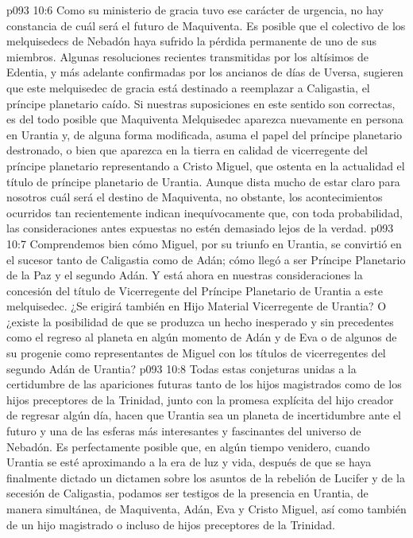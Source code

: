 \vs p093 10:6 Como su ministerio de gracia tuvo ese carácter de urgencia, no hay constancia de cuál será el futuro de Maquiventa. Es posible que el colectivo de los melquisedecs de Nebadón haya sufrido la pérdida permanente de uno de sus miembros. Algunas resoluciones recientes transmitidas por los altísimos de Edentia, y más adelante confirmadas por los ancianos de días de Uversa, sugieren que este melquisedec de gracia está destinado a reemplazar a Caligastia, el príncipe planetario caído. Si nuestras suposiciones en este sentido son correctas, es del todo posible que Maquiventa Melquisedec aparezca nuevamente en persona en Urantia y, de alguna forma modificada, asuma el papel del príncipe planetario destronado, o bien que aparezca en la tierra en calidad de vicerregente del príncipe planetario representando a Cristo Miguel, que ostenta en la actualidad el título de príncipe planetario de Urantia. Aunque dista mucho de estar claro para nosotros cuál será el destino de Maquiventa, no obstante, los acontecimientos ocurridos tan recientemente indican inequívocamente que, con toda probabilidad, las consideraciones antes expuestas no estén demasiado lejos de la verdad.
\vs p093 10:7 Comprendemos bien cómo Miguel, por su triunfo en Urantia, se convirtió en el sucesor tanto de Caligastia como de Adán; cómo llegó a ser Príncipe Planetario de la Paz y el segundo Adán. Y está ahora en nuestras consideraciones la concesión del título de Vicerregente del Príncipe Planetario de Urantia a este melquisedec. ¿Se erigirá también en Hijo Material Vicerregente de Urantia? O ¿existe la posibilidad de que se produzca un hecho inesperado y sin precedentes como el regreso al planeta en algún momento de Adán y de Eva o de algunos de su progenie como representantes de Miguel con los títulos de vicerregentes del segundo Adán de Urantia?
\vs p093 10:8 Todas estas conjeturas unidas a la certidumbre de las apariciones futuras tanto de los hijos magistrados como de los hijos preceptores de la Trinidad, junto con la promesa explícita del hijo creador de regresar algún día, hacen que Urantia sea un planeta de incertidumbre ante el futuro y una de las esferas más interesantes y fascinantes del universo de Nebadón. Es perfectamente posible que, en algún tiempo venidero, cuando Urantia se esté aproximando a la era de luz y vida, después de que se haya finalmente dictado un dictamen sobre los asuntos de la rebelión de Lucifer y de la secesión de Caligastia, podamos ser testigos de la presencia en Urantia, de manera simultánea, de Maquiventa, Adán, Eva y Cristo Miguel, así como también de un hijo magistrado o incluso de hijos preceptores de la Trinidad.
